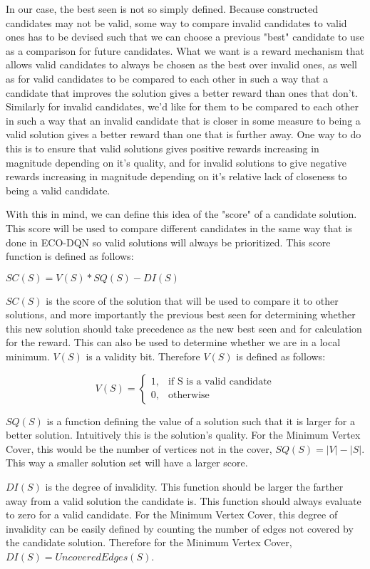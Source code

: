 \documentclass{article}
\begin{document}
In our case, the best seen is not so simply defined. Because constructed candidates may not be valid, some way to compare invalid candidates to valid ones has to be devised such that we can choose a previous "best" candidate to use as a comparison for future candidates. What we want is a reward mechanism that allows valid candidates to always be chosen as the best over invalid ones, as well as for valid candidates to be compared to each other in such a way that a candidate that improves the solution gives a better reward than ones that don't. Similarly for invalid candidates, we'd like for them to be compared to each other in such a way that an invalid candidate that is closer in some measure to being a valid solution gives a better reward than one that is further away. One way to do this is to ensure that valid solutions gives positive rewards increasing in magnitude depending on it's quality, and for invalid solutions to give negative rewards increasing in magnitude depending on it's relative lack of closeness to being a valid candidate.

With this in mind, we can define this idea of the "score" of a candidate solution. This score will be used to compare different candidates in the same way that is done in ECO-DQN so valid solutions will always be prioritized. This score function is defined as follows:

$SC(S) = V(S) * SQ(S) - DI(S)$

$SC(S)$ is the score of the solution that will be used to compare it to other solutions, and more importantly the previous best seen for determining whether this new solution should take precedence as the new best seen and for calculation for the reward. This can also be used to determine whether we are in a local minimum. $V(S)$ is a validity bit. Therefore $V(S)$ is defined as follows:

\[
    V(S) =
    \begin{cases}
        1,&\text{if S is a valid candidate}\\
        0,&\text{otherwise}
    \end{cases}
\]

$SQ(S)$ is a function defining the value of a solution such that it is larger for a better solution. Intuitively this is the solution's quality. For the Minimum Vertex Cover, this would be the number of vertices not in the cover, $SQ(S) = |V| - |S|$. This way a smaller solution set will have a larger score.

$DI(S)$ is the degree of invalidity. This function should be larger the farther away from a valid solution the candidate is. This function should always evaluate to zero for a valid candidate. For the Minimum Vertex Cover, this degree of invalidity can be easily defined by counting the number of edges not covered by the candidate solution. Therefore for the Minimum Vertex Cover, $DI(S) = UncoveredEdges(S)$. 
\end{document}
